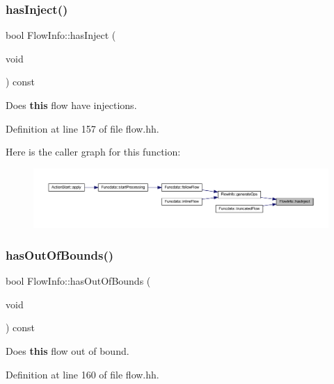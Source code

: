 \subsubsection{\texorpdfstring{hasInject()}{hasInject()}}
{\footnotesize\ttfamily bool Flow\+Info\+::has\+Inject (\begin{DoxyParamCaption}\item[{void}]{ }\end{DoxyParamCaption}) const\hspace{0.3cm}{\ttfamily [inline]}}



Does {\bfseries{this}} flow have injections. 



Definition at line 157 of file flow.\+hh.

Here is the caller graph for this function\+:
\nopagebreak
\begin{figure}[H]
\begin{center}
\leavevmode
\includegraphics[width=350pt]{class_flow_info_a36a38cdf15f8d2f4eb985c6adfa71e5f_icgraph}
\end{center}
\end{figure}
\mbox{\label{class_flow_info_a95e57a20f50cfb17893aeac952bbb85b}} 
\subsubsection{\texorpdfstring{hasOutOfBounds()}{hasOutOfBounds()}}
{\footnotesize\ttfamily bool Flow\+Info\+::has\+Out\+Of\+Bounds (\begin{DoxyParamCaption}\item[{void}]{ }\end{DoxyParamCaption}) const\hspace{0.3cm}{\ttfamily [inline]}}



Does {\bfseries{this}} flow out of bound. 



Definition at line 160 of file flow.\+hh.

